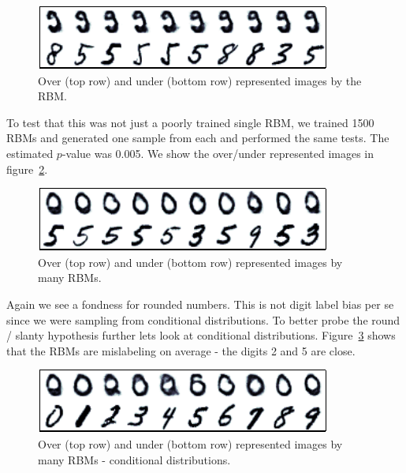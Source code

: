 \documentclass{article}
\begin{document}
\begin{figure}[ht]
\centering
\includegraphics[width=0.98\columnwidth]{figures/rbm_over_under}
\caption{
Over (top row) and under (bottom row) represented images by the RBM.
}
\label{fig:rbm_over_under}
\end{figure}

To test that this was not just a poorly trained single RBM, we trained 1500 RBMs and generated one sample from each and performed the same tests.
The estimated $p$-value was 0.005.
We show the over/under represented images in figure~\ref{fig:many_rbm_over_under}.

\begin{figure}[ht]
\centering
\includegraphics[width=0.98\columnwidth]{figures/many_rbm_over_under}
\caption{
Over (top row) and under (bottom row) represented images by many RBMs.
}
\label{fig:many_rbm_over_under}
\end{figure}

Again we see a fondness for rounded numbers.
This is not digit label bias per se since we were sampling from conditional distributions.
To better probe the round / slanty hypothesis further lets look at conditional distributions.
Figure~\ref{fig:many_rbm_over_under_digit} shows that the RBMs are mislabeling on average - the digits 2 and 5 are close.

\begin{figure}[ht]
\centering
\includegraphics[width=0.98\columnwidth]{figures/many_rbm_over_under_digit}
\caption{
Over (top row) and under (bottom row) represented images by many RBMs - conditional distributions.
}
\label{fig:many_rbm_over_under_digit}
\end{figure}
\end{document}

